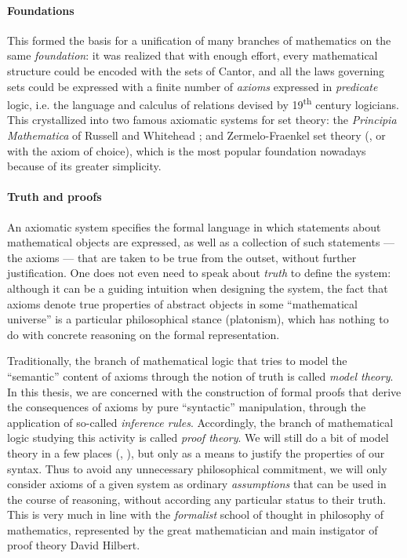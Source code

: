 \paragraph{Foundations}

This formed the basis for a unification of many branches of mathematics on the
same \emph{foundation}: it was realized that with enough effort, every
mathematical structure could be encoded with the sets of Cantor, and all the
laws governing sets could be expressed with a finite number of \emph{axioms}
expressed in \emph{predicate} logic, i.e. the language and calculus of relations
devised by 19\textsuperscript{th} century logicians. This crystallized into two
famous axiomatic systems for set theory: the \textit{Principia Mathematica} of
Russell and Whitehead ; and Zermelo-Fraenkel set theory
(, or  with the axiom of choice), which is the most popular
foundation nowadays because of its greater simplicity.

\paragraph{Truth and proofs}

An axiomatic system specifies the formal language in which statements about
mathematical objects are expressed, as well as a collection of such statements
--- the axioms --- that are taken to be true from the outset, without further
justification. One does not even need to speak about \emph{truth} to define the
system: although it can be a guiding intuition when designing the system, the
fact that axioms denote true properties of abstract objects in some
``mathematical universe'' is a particular philosophical stance (platonism),
which has nothing to do with concrete reasoning on the formal representation.

Traditionally, the branch of mathematical logic that tries to model the
``semantic'' content of axioms through the notion of truth is called \emph{model
theory}. In this thesis, we are concerned with the construction of formal proofs
that derive the consequences of axioms by pure ``syntactic'' manipulation,
through the application of so-called \emph{inference rules}. Accordingly, the
branch of mathematical logic studying this activity is called \emph{proof
theory}. We will still do a bit of model theory in a few places
(, ), but only as a means to
justify the properties of our syntax. Thus to avoid any unnecessary
philosophical commitment, we will only consider axioms of a given system as
ordinary \emph{assumptions} that can be used in the course of reasoning, without
according any particular status to their truth. This is very much in line with
the \emph{formalist} school of thought in philosophy of mathematics, represented
by the great mathematician and main instigator of proof theory David Hilbert.

